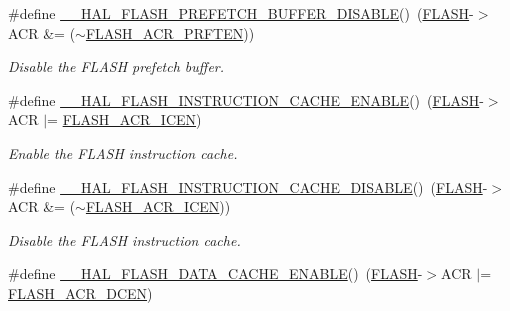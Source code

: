 \begin{DoxyCompactItemize}
\#define \hyperlink{group___f_l_a_s_h___exported___macros_ga646a4cb92e85659334d14a8c78f0ede8}{\+\_\+\+\_\+\+H\+A\+L\+\_\+\+F\+L\+A\+S\+H\+\_\+\+P\+R\+E\+F\+E\+T\+C\+H\+\_\+\+B\+U\+F\+F\+E\+R\+\_\+\+D\+I\+S\+A\+B\+LE}()~(\hyperlink{group___peripheral__declaration_ga844ea28ba1e0a5a0e497f16b61ea306b}{F\+L\+A\+SH}-\/$>$A\+CR \&= ($\sim$\hyperlink{group___peripheral___registers___bits___definition_ga082e7e91fffee86db39676396d01a8e0}{F\+L\+A\+S\+H\+\_\+\+A\+C\+R\+\_\+\+P\+R\+F\+T\+EN}))
\begin{DoxyCompactList}\small\item\em Disable the F\+L\+A\+SH prefetch buffer. \end{DoxyCompactList}\item 
\#define \hyperlink{group___f_l_a_s_h___exported___macros_gaddb00cd85fe48a524fad33c7fe63e038}{\+\_\+\+\_\+\+H\+A\+L\+\_\+\+F\+L\+A\+S\+H\+\_\+\+I\+N\+S\+T\+R\+U\+C\+T\+I\+O\+N\+\_\+\+C\+A\+C\+H\+E\+\_\+\+E\+N\+A\+B\+LE}()~(\hyperlink{group___peripheral__declaration_ga844ea28ba1e0a5a0e497f16b61ea306b}{F\+L\+A\+SH}-\/$>$A\+CR $\vert$= \hyperlink{group___peripheral___registers___bits___definition_ga51d8b1dd2c46942d377c579a38dce711}{F\+L\+A\+S\+H\+\_\+\+A\+C\+R\+\_\+\+I\+C\+EN})
\begin{DoxyCompactList}\small\item\em Enable the F\+L\+A\+SH instruction cache. \end{DoxyCompactList}\item 
\#define \hyperlink{group___f_l_a_s_h___exported___macros_ga01bf00ed6e7c0e74ed0931f3b8b033ed}{\+\_\+\+\_\+\+H\+A\+L\+\_\+\+F\+L\+A\+S\+H\+\_\+\+I\+N\+S\+T\+R\+U\+C\+T\+I\+O\+N\+\_\+\+C\+A\+C\+H\+E\+\_\+\+D\+I\+S\+A\+B\+LE}()~(\hyperlink{group___peripheral__declaration_ga844ea28ba1e0a5a0e497f16b61ea306b}{F\+L\+A\+SH}-\/$>$A\+CR \&= ($\sim$\hyperlink{group___peripheral___registers___bits___definition_ga51d8b1dd2c46942d377c579a38dce711}{F\+L\+A\+S\+H\+\_\+\+A\+C\+R\+\_\+\+I\+C\+EN}))
\begin{DoxyCompactList}\small\item\em Disable the F\+L\+A\+SH instruction cache. \end{DoxyCompactList}\item 
\#define \hyperlink{group___f_l_a_s_h___exported___macros_gad94db5b43a234c8dd3dde8fcf0e4cedd}{\+\_\+\+\_\+\+H\+A\+L\+\_\+\+F\+L\+A\+S\+H\+\_\+\+D\+A\+T\+A\+\_\+\+C\+A\+C\+H\+E\+\_\+\+E\+N\+A\+B\+LE}()~(\hyperlink{group___peripheral__declaration_ga844ea28ba1e0a5a0e497f16b61ea306b}{F\+L\+A\+SH}-\/$>$A\+CR $\vert$= \hyperlink{group___peripheral___registers___bits___definition_ga5a9a5cc3aa05dc62264addab1008c896}{F\+L\+A\+S\+H\+\_\+\+A\+C\+R\+\_\+\+D\+C\+EN})

\end{DoxyCompactItemize}
